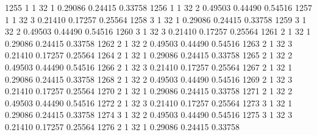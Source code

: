 \documentclass{article}
\begin{document}
\begin{Woutput}
1255      1       1      32       1       0.29086    0.24415    0.33758
1256      1       1      32       2       0.49503    0.44490    0.54516
1257      1       1      32       3       0.21410    0.17257    0.25564
1258      3       1      32       1       0.29086    0.24415    0.33758
1259      3       1      32       2       0.49503    0.44490    0.54516
1260      3       1      32       3       0.21410    0.17257    0.25564
1261      2       1      32       1       0.29086    0.24415    0.33758
1262      2       1      32       2       0.49503    0.44490    0.54516
1263      2       1      32       3       0.21410    0.17257    0.25564
1264      2       1      32       1       0.29086    0.24415    0.33758
1265      2       1      32       2       0.49503    0.44490    0.54516
1266      2       1      32       3       0.21410    0.17257    0.25564
1267      2       1      32       1       0.29086    0.24415    0.33758
1268      2       1      32       2       0.49503    0.44490    0.54516
1269      2       1      32       3       0.21410    0.17257    0.25564
1270      2       1      32       1       0.29086    0.24415    0.33758
1271      2       1      32       2       0.49503    0.44490    0.54516
1272      2       1      32       3       0.21410    0.17257    0.25564
1273      3       1      32       1       0.29086    0.24415    0.33758
1274      3       1      32       2       0.49503    0.44490    0.54516
1275      3       1      32       3       0.21410    0.17257    0.25564
1276      2       1      32       1       0.29086    0.24415    0.33758


\end{Woutput}
\end{document}
